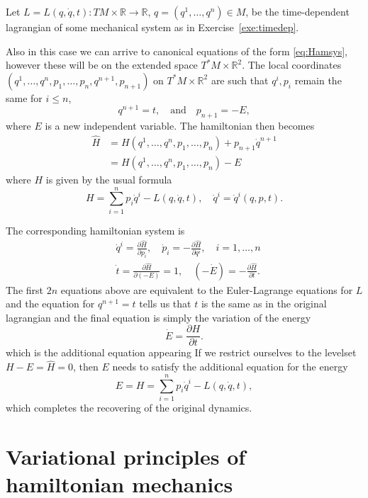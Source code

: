 \documentclass[english,fontsize=11pt,paper=a5,oneside]{scrbook}
\newcommand{\R}{\mathbb{R}}
\theoremstyle{definition}
\begin{document}
Let $L=L(q,\dot q,t): TM\times\R\to\R$, $q=(q^1,\ldots,q^n)\in M$, be the time-dependent lagrangian of some mechanical system as in Exercise~\ref{exe:timedep}.

Also in this case we can arrive to canonical equations of the form \eqref{eq:Hamsys}, however these will be on the extended space $T^*M\times\R^2$. The local coordinates $(q^1,\ldots,q^n, p_1, \ldots,p_n, q^{n+1}, p_{n+1})$ on $T^*M\times\R^2$ are such that $q^i, p_i$ remain the same for $i\leq n$,
\begin{equation}
    q^{n+1} = t, \quad\mbox{and}\quad
    p_{n+1} = -E,
\end{equation}
where $E$ is a new independent variable.
The hamiltonian then becomes
\begin{align}
    \hat H &= H(q^1, \ldots, q^n, p_1, \ldots, p_n) + p_{n+1}\dot q^{n+1} \\
    &= H(q^1, \ldots, q^n, p_1, \ldots, p_n) - E
\end{align}
where $H$ is given by the usual formula
\begin{equation}
    H = \sum_{i=1}^n p_i \dot q^i - L(q, \dot q, t), \quad \dot q^i = \dot q^i(q,p,t).
\end{equation}

The corresponding hamiltonian system is
\begin{align}
    & \dot q^i = \frac{\partial \hat H}{\partial p_i}, \quad 
      \dot p_i = -\frac{\partial \hat H}{\partial q^i}, \quad
      i=1,\ldots,n\\
    & \dot t = \frac{\partial \hat H}{\partial (-E)} = 1, \quad {(-\dot E)} = -\frac{\partial \hat H}{\partial t}.
\end{align}
The first $2n$ equations above are equivalent to the Euler-Lagrange equations for $L$ and the equation for $q^{n+1} = t$ tells us that $t$ is the same as in the original lagrangian and the final equation is simply the variation of the energy
\begin{equation}
    \dot E = \frac{\partial H}{\partial t}.
\end{equation}
which is the additional equation appearing 
If we restrict ourselves to the levelset $H - E = \hat H = 0$, then $E$ needs to satisfy the additional equation for the energy
\begin{equation}
    E = H = \sum_{i=1}^n p_i \dot q^i - L(q, \dot q, t),
\end{equation}
which completes the recovering of the original dynamics.

\section{Variational principles of hamiltonian mechanics}
\end{document}
